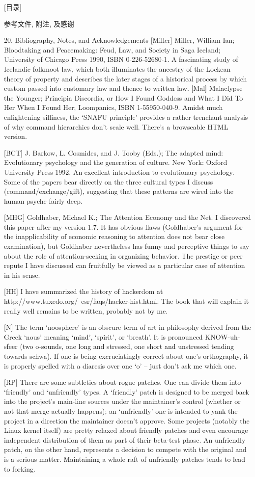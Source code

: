 \documentclass[a4paper,12pt,UTF8,twoside]{ctexbook}
\begin{document}
[目录]

参考文件, 附注, 及感谢

20. Bibliography, Notes, and Acknowledgements
[Miller] Miller, William Ian; Bloodtaking and Peacemaking: Feud, Law, and Society in Saga Iceland; University of Chicago Press 1990, ISBN 0-226-52680-1. A fascinating study of Icelandic folkmoot law, which both illuminates the ancestry of the Lockean theory of property and describes the later stages of a historical process by which custom passed into customary law and thence to written law.
[Mal] Malaclypse the Younger; Principia Discordia, or How I Found Goddess and What I Did To Her When I Found Her; Loompanics, ISBN 1-55950-040-9. Amidst much enlightening silliness, the `SNAFU principle' provides a rather trenchant analysis of why command hierarchies don't scale well. There's a browseable HTML version.

[BCT] J. Barkow, L. Cosmides, and J. Tooby (Eds.); The adapted mind: Evolutionary psychology and the generation of culture. New York: Oxford University Press 1992. An excellent introduction to evolutionary psychology. Some of the papers bear directly on the three cultural types I discuss (command/exchange/gift), suggesting that these patterns are wired into the human psyche fairly deep.

[MHG] Goldhaber, Michael K.; The Attention Economy and the Net. I discovered this paper after my version 1.7. It has obvious flaws (Goldhaber's argument for the inapplicability of economic reasoning to attention does not bear close examination), but Goldhaber nevertheless has funny and perceptive things to say about the role of attention-seeking in organizing behavior. The prestige or peer repute I have discussed can fruitfully be viewed as a particular case of attention in his sense.

[HH] I have summarized the history of hackerdom at http://www.tuxedo.org/~esr/faqs/hacker-hist.html. The book that will explain it really well remains to be written, probably not by me.

[N] The term `noosphere' is an obscure term of art in philosophy derived from the Greek `nous' meaning `mind', `spirit', or `breath'. It is pronounced KNOW-uh-sfeer (two o-sounds, one long and stressed, one short and unstressed tending towards schwa). If one is being excruciatingly correct about one's orthography, it is properly spelled with a diaresis over one `o' -- just don't ask me which one.

[RP] There are some subtleties about rogue patches. One can divide them into `friendly' and `unfriendly' types. A `friendly' patch is designed to be merged back into the project's main-line sources under the maintainer's control (whether or not that merge actually happens); an `unfriendly' one is intended to yank the project in a direction the maintainer doesn't approve. Some projects (notably the Linux kernel itself) are pretty relaxed about friendly patches and even encourage independent distribution of them as part of their beta-test phase. An unfriendly patch, on the other hand, represents a decision to compete with the original and is a serious matter. Maintaining a whole raft of unfriendly patches tends to lead to forking.
\end{document}
